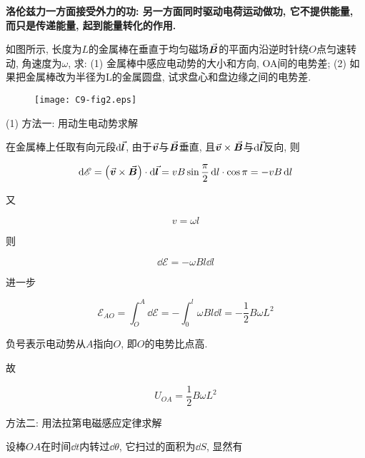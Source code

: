 \textbf{洛伦兹力一方面接受外力的功: 另一方面同时驱动电荷运动做功, 它不提供能量, 而只是传递能量, 起到能量转化的作用. }

\begin{example}
	如图所示, 长度为$L$的金属棒在垂直于均匀磁场$\va*{B}$的平面内沿逆时针绕$O$点匀速转动, 角速度为$\omega$, 求: 
	(1) 金属棒中感应电动势的大小和方向, OA间的电势差; 
	(2) 如果把金属棒改为半径为L的金属圆盘, 试求盘心和盘边缘之间的电势差. 
	
	\begin{figure}[H]
		\centering
		\texttt{[image: C9-fig2.eps]}
	\end{figure}
	
	\begin{solution}
		
		(1) 方法一: 用动生电动势求解
		
		在金属棒上任取有向元段$\dd{\va*{l}}$, 由于$\va*{v}$与$\va*{B}$垂直, 且$\va*{v} \times \va*{B}$与$\dd{\va*{l}}$反向, 则
		
		\begin{equation*}
			\dd{\mathscr{E}} = \qty(\va*{v} \times \va*{B}) \cdot \dd{\va*{l}} = vB\sin \dfrac{\pi}{2} \dd{l} \cdot \cos \pi = -vB \dd{l}
		\end{equation*}
		
		又
		
		\begin{equation*}
			v = \omega l
		\end{equation*}
		
		则
		
		\begin{equation*}
			\dd{\mathscr{E}} = -\omega B l \dd{l}
		\end{equation*}
		
		进一步
		
		\begin{equation*}
			\mathscr{E}_{AO} = \int_{O}^{A} \dd{\mathscr{E}} = - \int_{0}^{l} \omega B l \dd{l} = - \dfrac{1}{2} B \omega L^2
		\end{equation*}
		
		负号表示电动势从$A$指向$O$, 即$O$的电势比点高.
		
		故
		
		\begin{equation*}
			U_{OA} = \dfrac{1}{2} B \omega L^2
		\end{equation*}
		
		方法二: 用法拉第电磁感应定律求解
		
		设棒$OA$在时间$\dd{t}$内转过$\dd{\theta}$, 它扫过的面积为$\dd{S}$, 显然有
		

\end{solution}
\end{example}
